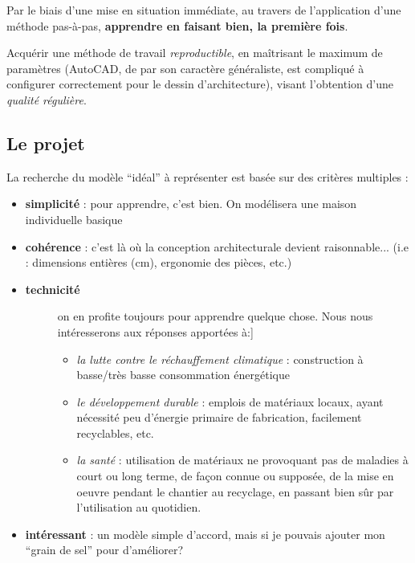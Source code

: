 \documentclass[a4paper,12pt,french]{sphinxmanual}
\begin{document}
Par le biais d'une mise en situation immédiate, au travers de l'application d'une méthode pas-à-pas, \textbf{apprendre en faisant bien, la première fois}.

Acquérir une méthode de travail \emph{reproductible}, en maîtrisant le maximum de paramètres (AutoCAD, de par son caractère généraliste, est compliqué à configurer correctement pour le dessin d'architecture), visant l'obtention d'une \emph{qualité régulière}.


\subsection{Le projet}
\label{init_su+acad/001_intro:le-projet}
La recherche du modèle ``idéal'' à représenter est basée sur des critères multiples :
\begin{itemize}
\item {} 
\textbf{simplicité} : pour apprendre, c'est bien. On modélisera une maison individuelle basique

\item {} 
\textbf{cohérence} : c'est là où la conception architecturale devient raisonnable... (i.e : dimensions entières (cm), ergonomie des pièces, etc.)

\item {} \begin{description}
\item[{\textbf{technicité}}] \leavevmode{[}on en profite toujours pour apprendre quelque chose. Nous nous intéresserons aux réponses apportées à:{]}\begin{itemize}
\item {} 
\emph{la lutte contre le réchauffement climatique} : construction à basse/très basse consommation énergétique

\item {} 
\emph{le développement durable} : emplois de matériaux locaux, ayant nécessité peu d'énergie primaire de fabrication, facilement recyclables, etc.

\item {} 
\emph{la santé} : utilisation de matériaux ne provoquant pas de maladies à court ou long terme, de façon connue ou supposée, de la mise en oeuvre pendant le chantier au recyclage, en passant bien sûr par l'utilisation au quotidien.

\end{itemize}

\end{description}

\item {} 
\textbf{intéressant} : un modèle simple d'accord, mais si je pouvais ajouter mon ``grain de sel'' pour d'améliorer?

\end{itemize}
\end{document}
